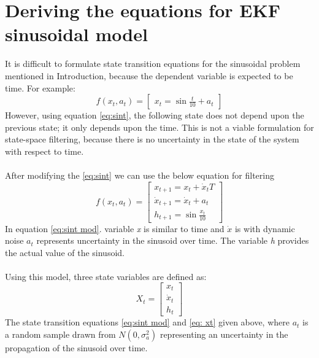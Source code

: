 \documentclass[12pt]{article}
\begin{document}
\section{Deriving the equations for EKF sinusoidal model}
It is difficult to formulate state transition equations for the sinusoidal problem mentioned in Introduction, because the dependent variable is expected to be time. For example: 
\begin{equation}
f(x_t,a_t) = \begin{bmatrix}
x_t = \sin \frac{t}{10} + a_t
\end{bmatrix}
\label{eq:sint}
\end{equation}
\indent
However, using equation \ref{eq:sint}, the following state does not depend upon the previous state; it only depends upon the time. This is not a viable formulation for state-space filtering, because there is no uncertainty in the state of the system with respect to time. \\
\\ \indent
After modifying the \ref{eq:sint} we can use the below equation for filtering
\begin{equation}
f(x_t,a_t) = \begin{bmatrix}
x_{t+1} = x_t + \dot{x}_t T \\
\dot{x}_{t+1} = \dot{x}_t + a_t \\
h_{t+1} = \sin \frac{x_t}{10}
\end{bmatrix}
\label{eq:sint mod}
\end{equation}
\indent
In equation \ref{eq:sint mod}. variable \textit{x} is similar to time and $\dot{x}$ is with dynamic noise $a_t$ represents uncertainty in the sinusoid over time. The variable \textit{h} provides the actual value of the sinusoid. \\
\\ \indent
Using this model, three state variables are defined as:
\begin{equation}
X_t = \begin{bmatrix}
x_t \\
\dot{x}_t \\
h_t
\end{bmatrix}
\label{eq: xt}
\end{equation}
\indent
The state transition equations \ref{eq:sint mod} and \ref{eq: xt} given above, where $a_t$ is a random sample drawn from $N(0,\sigma_a^2)$ representing an uncertainty in the propagation of the sinusoid over time. \\
\\ \indent
\end{document}
